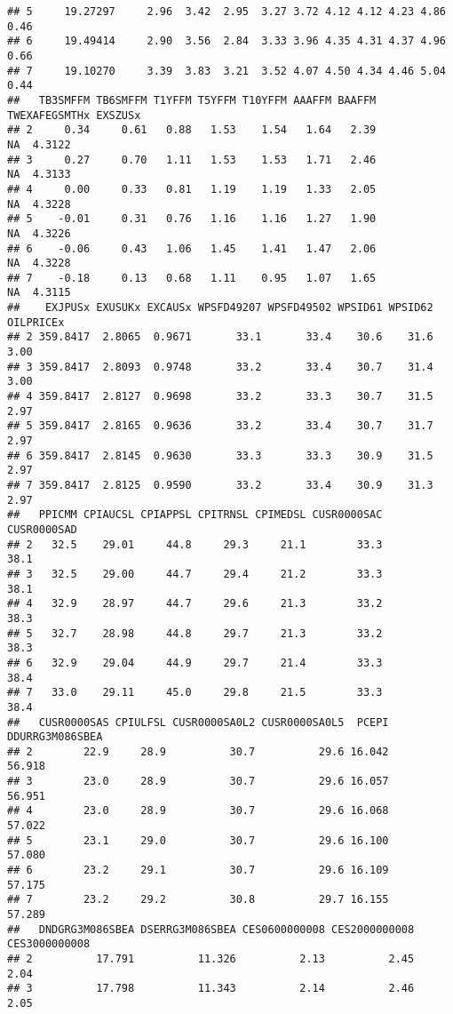 \documentclass[
]{article}
\begin{document}
\begin{verbatim}
## 5     19.27297     2.96  3.42  2.95  3.27 3.72 4.12 4.12 4.23 4.86      0.46
## 6     19.49414     2.90  3.56  2.84  3.33 3.96 4.35 4.31 4.37 4.96      0.66
## 7     19.10270     3.39  3.83  3.21  3.52 4.07 4.50 4.34 4.46 5.04      0.44
##   TB3SMFFM TB6SMFFM T1YFFM T5YFFM T10YFFM AAAFFM BAAFFM TWEXAFEGSMTHx EXSZUSx
## 2     0.34     0.61   0.88   1.53    1.54   1.64   2.39            NA  4.3122
## 3     0.27     0.70   1.11   1.53    1.53   1.71   2.46            NA  4.3133
## 4     0.00     0.33   0.81   1.19    1.19   1.33   2.05            NA  4.3228
## 5    -0.01     0.31   0.76   1.16    1.16   1.27   1.90            NA  4.3226
## 6    -0.06     0.43   1.06   1.45    1.41   1.47   2.06            NA  4.3228
## 7    -0.18     0.13   0.68   1.11    0.95   1.07   1.65            NA  4.3115
##    EXJPUSx EXUSUKx EXCAUSx WPSFD49207 WPSFD49502 WPSID61 WPSID62 OILPRICEx
## 2 359.8417  2.8065  0.9671       33.1       33.4    30.6    31.6      3.00
## 3 359.8417  2.8093  0.9748       33.2       33.4    30.7    31.4      3.00
## 4 359.8417  2.8127  0.9698       33.2       33.3    30.7    31.5      2.97
## 5 359.8417  2.8165  0.9636       33.2       33.4    30.7    31.7      2.97
## 6 359.8417  2.8145  0.9630       33.3       33.3    30.9    31.5      2.97
## 7 359.8417  2.8125  0.9590       33.2       33.4    30.9    31.3      2.97
##   PPICMM CPIAUCSL CPIAPPSL CPITRNSL CPIMEDSL CUSR0000SAC CUSR0000SAD
## 2   32.5    29.01     44.8     29.3     21.1        33.3        38.1
## 3   32.5    29.00     44.7     29.4     21.2        33.3        38.1
## 4   32.9    28.97     44.7     29.6     21.3        33.2        38.3
## 5   32.7    28.98     44.8     29.7     21.3        33.2        38.3
## 6   32.9    29.04     44.9     29.7     21.4        33.3        38.4
## 7   33.0    29.11     45.0     29.8     21.5        33.3        38.4
##   CUSR0000SAS CPIULFSL CUSR0000SA0L2 CUSR0000SA0L5  PCEPI DDURRG3M086SBEA
## 2        22.9     28.9          30.7          29.6 16.042          56.918
## 3        23.0     28.9          30.7          29.6 16.057          56.951
## 4        23.0     28.9          30.7          29.6 16.068          57.022
## 5        23.1     29.0          30.7          29.6 16.100          57.080
## 6        23.2     29.1          30.7          29.6 16.109          57.175
## 7        23.2     29.2          30.8          29.7 16.155          57.289
##   DNDGRG3M086SBEA DSERRG3M086SBEA CES0600000008 CES2000000008 CES3000000008
## 2          17.791          11.326          2.13          2.45          2.04
## 3          17.798          11.343          2.14          2.46          2.05

\end{verbatim}
\end{document}
